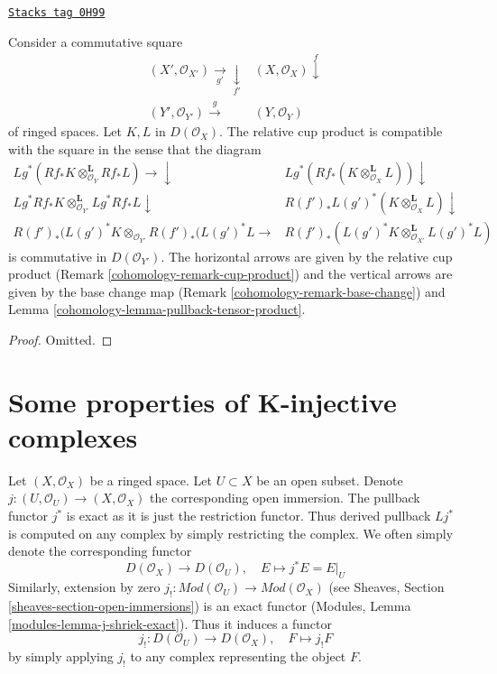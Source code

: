 \begin{lemma}
\label{cohomology-lemma-base-change-cup-product}
\href{https://stacks.math.columbia.edu/tag/0H99}{\texttt{Stacks tag 0H99}}

Consider a commutative square
$$
\begin{array}{cc}(X', \mathcal{O}_{X'}) \underset{g'}{\longrightarrow}\underset{f'}{\downarrow} & (X, \mathcal{O}_X) \overset{f}{\downarrow} \\ (Y', \mathcal{O}_{Y'}) \overset{g}{\longrightarrow} & (Y, \mathcal{O}_Y)\end{array}
$$
of ringed spaces. Let $K, L$ in $D(\mathcal{O}_X)$.
The relative cup product
is compatible with the square in the sense that the diagram
$$
\begin{array}{cc}Lg^*(Rf_*K \otimes_{\mathcal{O}_Y}^\mathbf{L} Rf_*L)
\longrightarrow\downarrow & Lg^*(Rf_*(K \otimes_{\mathcal{O}_X}^\mathbf{L} L)) \downarrow \\ Lg^*Rf_*K \otimes_{\mathcal{O}_{Y'}}^\mathbf{L} Lg^*Rf_*L \downarrow & R(f')_*L(g')^*(K \otimes_{\mathcal{O}_X}^\mathbf{L} L) \downarrow \\ R(f')_*(L(g')^*K \otimes_{\mathcal{O}_{Y'}} R(f')_*(L(g')^*L \longrightarrow & R(f')_*(L(g')^*K \otimes_{\mathcal{O}_{X'}}^\mathbf{L} L(g')^*L)\end{array}
$$
is commutative in $D(\mathcal{O}_{Y'})$. The horizontal arrows are given
by the relative cup product (Remark \ref{cohomology-remark-cup-product})
and the vertical arrows are given
by the base change map (Remark \ref{cohomology-remark-base-change})
and Lemma \ref{cohomology-lemma-pullback-tensor-product}.
\end{lemma}

\begin{proof}
Omitted.
\end{proof}

\section{Some properties of K-injective complexes}
\label{cohomology-section-properties-K-injective}
Let $(X, \mathcal{O}_X)$ be a ringed space. Let $U \subset X$ be an
open subset. Denote $j : (U, \mathcal{O}_U) \to (X, \mathcal{O}_X)$
the corresponding open immersion. The pullback functor $j^*$ is exact
as it is just the restriction functor. Thus derived pullback $Lj^*$ is
computed on any complex by simply restricting the complex. We often
simply denote the corresponding functor
$$
D(\mathcal{O}_X) \to D(\mathcal{O}_U),
\quad
E \mapsto j^*E = E|_U
$$
Similarly, extension by zero
$j_! : \textit{Mod}(\mathcal{O}_U) \to \textit{Mod}(\mathcal{O}_X)$
(see Sheaves, Section \ref{sheaves-section-open-immersions})
is an exact functor (Modules, Lemma \ref{modules-lemma-j-shriek-exact}).
Thus it induces a functor
$$
j_! : D(\mathcal{O}_U) \to D(\mathcal{O}_X),\quad
F \mapsto j_!F
$$
by simply applying $j_!$ to any complex representing the object $F$.

